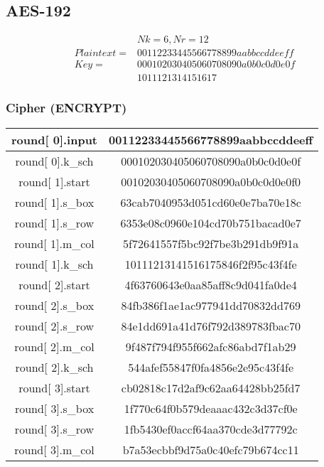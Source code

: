 \newpage
\subsection{AES-192}

\begin{align*}
&Nk=6, Nr=12 \\
Plaintext = &00112233445566778899aabbccddeeff \\
Key = &000102030405060708090a0b0c0d0e0f \\
	  &1011121314151617
\end{align*}

\subsubsection{Cipher (ENCRYPT)}

\begin{center}
\begin{longtable}{|c|c|}
\hline
round[ 0].input&    00112233445566778899aabbccddeeff\\
\hline
round[ 0].k\_sch&    000102030405060708090a0b0c0d0e0f\\
\hline
round[ 1].start&    00102030405060708090a0b0c0d0e0f0\\
\hline
round[ 1].s\_box& 63cab7040953d051cd60e0e7ba70e18c\\ 
\hline
round[ 1].s\_row& 6353e08c0960e104cd70b751bacad0e7 \\
\hline
round[ 1].m\_col& 5f72641557f5bc92f7be3b291db9f91a \\
\hline
round[ 1].k\_sch& 10111213141516175846f2f95c43f4fe \\
\hline
round[ 2].start& 4f63760643e0aa85aff8c9d041fa0de4 \\
\hline
round[ 2].s\_box& 84fb386f1ae1ac977941dd70832dd769 \\
\hline
round[ 2].s\_row& 84e1dd691a41d76f792d389783fbac70 \\
\hline
round[ 2].m\_col& 9f487f794f955f662afc86abd7f1ab29 \\
\hline
round[ 2].k\_sch& 544afef55847f0fa4856e2e95c43f4fe \\
\hline
round[ 3].start& cb02818c17d2af9c62aa64428bb25fd7 \\
\hline
round[ 3].s\_box& 1f770c64f0b579deaaac432c3d37cf0e \\
\hline
round[ 3].s\_row& 1fb5430ef0accf64aa370cde3d77792c \\
\hline
round[ 3].m\_col& b7a53ecbbf9d75a0c40efc79b674cc11 \\

\end{longtable}
\end{center}
